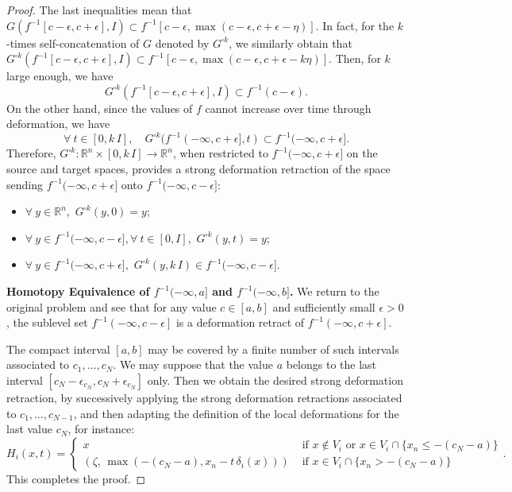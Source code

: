 \documentclass[11pt]{article}
\newcommand{\R}{\mathbb{R}}
\newcommand{\eps}{\epsilon}
\newcommand{\inter}{\cap}
\newcommand{\level}[2]{{#1}^{-1}\left({#2}\right)}
\newcommand{\sublevel}[2]{{#1}^{-1}\left(-\infty, {#2}\right]}
\theoremstyle{plain}
\theoremstyle{definition}
\theoremstyle{remark}
\begin{document}
\begin{proof}
		The last inequalities mean that $G( f^{-1}[c-\eps, c+\eps], I ) \subset f^{-1}[c-\eps, \max(c-\eps,c+\eps - \eta)]$.
		In fact, for the $k$-times self-concatenation of $G$ denoted by $G^{\square k}$, we similarly obtain that $G^{\square k}( f^{-1}[c-\eps, c+\eps], I ) \subset f^{-1}[c-\eps,\max(c-\eps, c+\eps - k\eta)]$. Then, for $k$ large enough, we have
		\[G^{\square k}( f^{-1}[c-\eps, c+\eps], I ) \subset \level{f}{c-\eps}.\]
		On the other hand, since the values of $f$ cannot increase over time through deformation, we have
		\[\forall\ t \in [0, k \, I], \quad G^{\square k}(f^{-1}(-\infty, c+\eps], t) \subset f^{-1}(-\infty, c+\eps].\]
		Therefore, $G^{\square k} : \R^n \times [0, k \, I] \to \R^n$, when restricted to $f^{-1}(-\infty, c+\eps]$ on the source and target spaces, provides a strong deformation retraction of the space sending $f^{-1}(-\infty, c+\eps]$ onto $f^{-1}(-\infty, c-\eps]$:
		\begin{itemize}
			\item $\forall\ y \in \R^n$,\, $G^{\square k}(y, 0) = y$;
			\item $\forall\ y \in f^{-1}(-\infty, c-\eps], \forall\ t \in [0, I]$,\, $G^{\square k}(y, t) = y$;
			\item $\forall\ y \in f^{-1}(-\infty, c+\eps]$,\, $G^{\square k}(y, k\,I) \in f^{-1}(-\infty, c-\eps]$.
		\end{itemize}
		
		\textbf{Homotopy Equivalence of $f^{-1}(-\infty, a]$ and $f^{-1}(-\infty, b]$.}
		We return to the original problem and see that for any value $c \in [a,b]$ and sufficiently small $\epsilon > 0$, the sublevel set $\sublevel{f}{c-\epsilon}$ is a deformation retract of $\sublevel{f}{c+\epsilon}$.
		
		The compact interval $[a,b]$ may be covered by a finite number of such intervals associated to $c_1, \ldots, c_N$. We may suppose that the value $a$ belongs to the last interval $[c_N-\eps_{c_N}, c_N+ \eps_{c_N}]$ only. Then we obtain the desired strong deformation retraction, by successively applying the strong deformation retractions associated to $c_1, \ldots, c_{N-1}$, and then adapting the definition of the local deformations for the last value $c_N$, for instance:
		\[ H_i(x,t) =
		\begin{cases}
			x & \text{ if } x \notin V_i \text{ or } x \in V_i \inter \{x_n \leq -(c_N - a)\} \\
			(\zeta,\, \max(-(c_N - a), x_n - t \, \delta_i(x) )) & \text{ if } x \in V_i \inter \{x_n > -(c_N - a)\}
		\end{cases}.
		\]
		This completes the proof.\end{proof}
	
\end{document}
